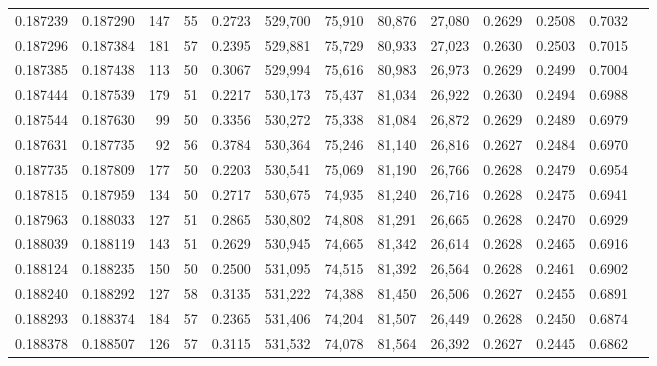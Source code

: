 \begin{tabular}{rrrrrrrrrrrrr}
0.187239 & 0.187290 &   147 &  55 &                                     0.2723 & 529,700 &  75,910 &  80,876 &  27,080 & 0.2629 & 0.2508 & 0.7032 \\
0.187296 & 0.187384 &   181 &  57 &                                     0.2395 & 529,881 &  75,729 &  80,933 &  27,023 & 0.2630 & 0.2503 & 0.7015 \\
0.187385 & 0.187438 &   113 &  50 &                                     0.3067 & 529,994 &  75,616 &  80,983 &  26,973 & 0.2629 & 0.2499 & 0.7004 \\
0.187444 & 0.187539 &   179 &  51 &                                     0.2217 & 530,173 &  75,437 &  81,034 &  26,922 & 0.2630 & 0.2494 & 0.6988 \\
0.187544 & 0.187630 &    99 &  50 &                                     0.3356 & 530,272 &  75,338 &  81,084 &  26,872 & 0.2629 & 0.2489 & 0.6979 \\
0.187631 & 0.187735 &    92 &  56 &                                     0.3784 & 530,364 &  75,246 &  81,140 &  26,816 & 0.2627 & 0.2484 & 0.6970 \\
0.187735 & 0.187809 &   177 &  50 &                                     0.2203 & 530,541 &  75,069 &  81,190 &  26,766 & 0.2628 & 0.2479 & 0.6954 \\
0.187815 & 0.187959 &   134 &  50 &                                     0.2717 & 530,675 &  74,935 &  81,240 &  26,716 & 0.2628 & 0.2475 & 0.6941 \\
0.187963 & 0.188033 &   127 &  51 &                                     0.2865 & 530,802 &  74,808 &  81,291 &  26,665 & 0.2628 & 0.2470 & 0.6929 \\
0.188039 & 0.188119 &   143 &  51 &                                     0.2629 & 530,945 &  74,665 &  81,342 &  26,614 & 0.2628 & 0.2465 & 0.6916 \\
0.188124 & 0.188235 &   150 &  50 &                                     0.2500 & 531,095 &  74,515 &  81,392 &  26,564 & 0.2628 & 0.2461 & 0.6902 \\
0.188240 & 0.188292 &   127 &  58 &                                     0.3135 & 531,222 &  74,388 &  81,450 &  26,506 & 0.2627 & 0.2455 & 0.6891 \\
0.188293 & 0.188374 &   184 &  57 &                                     0.2365 & 531,406 &  74,204 &  81,507 &  26,449 & 0.2628 & 0.2450 & 0.6874 \\
0.188378 & 0.188507 &   126 &  57 &                                     0.3115 & 531,532 &  74,078 &  81,564 &  26,392 & 0.2627 & 0.2445 & 0.6862 \\

\end{tabular}
